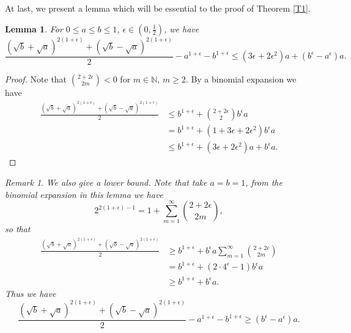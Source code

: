 \documentclass[10pt]{article} \usepackage[utf8]{inputenc}
\newtheorem{lem}{Lemma}[section]
\theoremstyle{definition}
\theoremstyle{remark}
\newtheorem{rem}{Remark}[section]
\numberwithin{equation}{section}
\begin{document}
At last, we present a lemma which will be essential to the proof of Theorem \ref{T1}.
\begin{lem}
\label{L24}
For $0 \leq a \leq b \leq 1$, $\epsilon \in (0,\frac{1}{2})$, we have
\begin{equation}
\frac{(\sqrt{b}+\sqrt{a})^{2(1+\epsilon)}+(\sqrt{b}-\sqrt{a})^{2(1+\epsilon)}}{2}-a^{1+\epsilon}-b^{1+\epsilon} \leq (3\epsilon +2\epsilon^2)a + (b^\epsilon-a^\epsilon)a.
\end{equation}
\end{lem}
\begin{proof}
Note that $\binom{2+2\epsilon}{2m}<0$ for $m\in \mathbb{N}$, $m\geq2$. By a binomial expansion we have
\begin{equation}
\begin{aligned}
\frac{(\sqrt{b}+\sqrt{a})^{2(1+\epsilon)}+(\sqrt{b}-\sqrt{a})^{2(1+\epsilon)}}{2} &\leq b^{1+\epsilon}+ \binom{2+2\epsilon}{2}b^{\epsilon}a\\
&= b^{1+\epsilon}+ (1+3\epsilon +2\epsilon^2)b^{\epsilon}a\\
&\leq b^{1+\epsilon}+(3\epsilon +2\epsilon^2)a+b^{\epsilon}a.
\end{aligned}
\end{equation}
\end{proof} 
\begin{rem}
\emph{
We also give a lower bound. Note that take $a=b=1$, from the binomial expansion in this lemma we have 
$$2^{2(1+\epsilon)-1}= 1+\sum\limits_{m=1}^{\infty}\binom{2+2\epsilon}{2m},$$
so that 
\begin{equation}
\begin{aligned}
\frac{(\sqrt{b}+\sqrt{a})^{2(1+\epsilon)}+(\sqrt{b}-\sqrt{a})^{2(1+\epsilon)}}{2} &\geq b^{1+\epsilon}+ b^{\epsilon}a\sum\limits_{m=1}^{\infty}\binom{2+2\epsilon}{2m}\\
&= b^{1+\epsilon}+(2\cdot 4^\epsilon -1)b^{\epsilon}a\\
&\geq b^{1+\epsilon}+b^{\epsilon}a.
\end{aligned}
\end{equation}
Thus we have 
\begin{equation}
\label{2.7}
\frac{(\sqrt{b}+\sqrt{a})^{2(1+\epsilon)}+(\sqrt{b}-\sqrt{a})^{2(1+\epsilon)}}{2}-a^{1+\epsilon}-b^{1+\epsilon} \geq (b^\epsilon-a^\epsilon)a.
\end{equation}
}
\end{rem}
\end{document}
